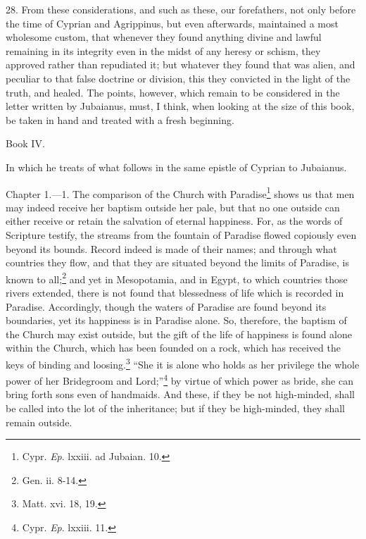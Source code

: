 28. From these considerations, and such as these, our forefathers, not only before the time of Cyprian and Agrippinus, but even afterwards, maintained a most wholesome custom, that whenever they found anything divine and lawful remaining in its integrity even in the midst of any heresy or schism, they approved rather than repudiated it; but whatever they found that was alien, and peculiar to that false doctrine or division, this they convicted in the light of the truth, and healed. The points, however, which remain to be considered in the letter written by Jubaianus, must, I think, when looking at the size of this book, be taken in hand and treated with a fresh beginning.


Book IV.

In which he treats of what follows in the same epistle of Cyprian to Jubaianus.


Chapter 1.—1. The comparison of the Church with Paradise\footnote{\par  Cypr. \emph{Ep}. lxxiii. ad Jubaian. 10.} shows us that men may indeed receive her baptism outside her pale, but that no one outside can either receive or retain the salvation of eternal happiness. For, as the words of Scripture testify, the streams from the fountain of Paradise flowed copiously even beyond its bounds. Record indeed is made of their names; and through what countries they flow, and that they are situated beyond the limits of Paradise, is known to all;\footnote{\par  Gen. ii. 8-14.} and yet in Mesopotamia, and in Egypt, to which countries those rivers extended, there is not found that blessedness of life which is recorded in Paradise. Accordingly, though the waters of Paradise are found beyond its boundaries, yet its happiness is in Paradise alone. So, therefore, the baptism of the Church may exist outside, but the gift of the life of happiness is found alone within the Church, which has been founded on a rock, which has received the keys of binding and loosing.\footnote{\par  Matt. xvi. 18, 19.} ``She it is alone who holds as her privilege the whole power of her Bridegroom and Lord;''\footnote{\par  Cypr. \emph{Ep}. lxxiii. 11.} by virtue of which power as bride, she can bring forth sons even of handmaids. And these, if they be not high-minded, shall be called into the lot of the inheritance; but if they be high-minded, they shall remain outside.

